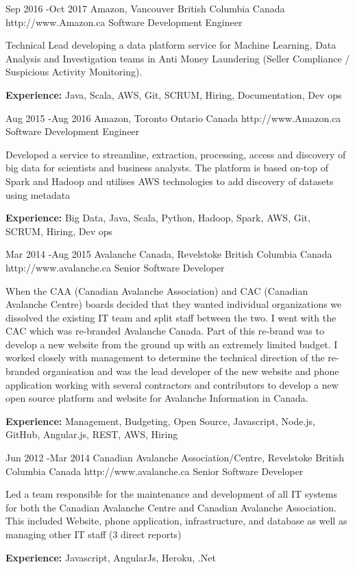 \documentclass{article}
\begin{document}
\begin{job}
{Sep 2016 -}{Oct 2017}
{Amazon, Vancouver British Columbia Canada}
{http://www.Amazon.ca}
{Software Development Engineer}%
{Technical Lead developing a data platform service for Machine Learning, Data Analysis and Investigation teams in Anti Money Laundering (Seller Compliance / Suspicious Activity Monitoring). \\
\rule{0mm}{5mm}\textbf{Experience:} Java, Scala, AWS, Git, SCRUM, Hiring, Documentation, Dev ops}
\end{job}


\begin{job}
{Aug 2015 -}{Aug 2016}
{Amazon, Toronto Ontario Canada}
{http://www.Amazon.ca}
{Software Development Engineer}%
{Developed a service to streamline, extraction, processing, access and discovery of big data for scientists and business analysts. The platform is based on-top of Spark and Hadoop and utilises AWS technologies to add discovery of datasets using metadata \\
\rule{0mm}{5mm}\textbf{Experience:} Big Data, Java, Scala, Python, Hadoop, Spark, AWS, Git, SCRUM, Hiring, Dev ops}
\end{job}

\begin{job}
{Mar 2014 -}{Aug 2015}
{Avalanche Canada, Revelstoke British Columbia Canada}
{http://www.avalanche.ca}
{Senior Software Developer}%
{When the CAA (Canadian Avalanche Association) and CAC (Canadian Avalanche Centre) boards decided that they wanted individual organizations we dissolved the existing IT team and split staff between the two. I went with the CAC which was re-branded Avalanche Canada. Part of this re-brand was to develop a new website from the ground up with an extremely limited budget. I worked closely with management to determine the technical direction of the re-branded organisation and was the lead developer of the new website and phone application working with several contractors and contributors to develop a new open source platform and website for Avalanche Information in Canada. \\
\rule{0mm}{5mm}\textbf{Experience:} Management, Budgeting, Open Source, Javascript, Node.js, GitHub, Angular.js, REST, AWS, Hiring }
\end{job}

\begin{job}
{Jun 2012 -}{Mar 2014}
{Canadian Avalanche Association/Centre, Revelstoke British Columbia Canada}
{http://www.avalanche.ca}
{Senior Software Developer}%
{Led a team responsible for the maintenance and development of all IT systems for both the Canadian Avalanche Centre and Canadian Avalanche Association. This included Website, phone application, infrastructure, and database as well as managing other IT staff (3 direct reports)\\
\rule{0mm}{5mm}\textbf{Experience:} Javascript, AngularJs, Heroku, .Net} 
\end{job}
\end{document}
